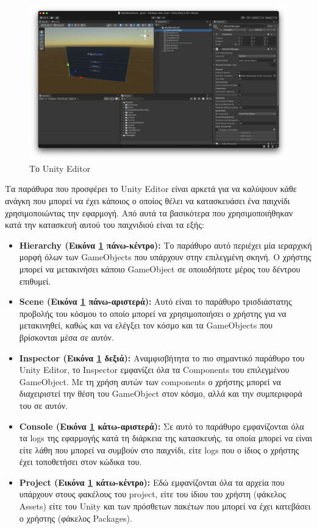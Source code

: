 \begin{figure}[H]
    \centering
    \includegraphics[width=1\linewidth]{sections/4/1/images/unity_editor}
    \caption{Το Unity Editor}
    \label{fig:unity_editor}
\end{figure}

Τα παράθυρα που προσφέρει το Unity Editor είναι αρκετά για να καλύψουν κάθε ανάγκη που μπορεί να έχει κάποιος ο οποίος θέλει να κατασκευάσει ένα παιχνίδι χρησιμοποιώντας την εφαρμογή. Από αυτά τα βασικότερα που χρησιμοποιήθηκαν κατά την κατασκευή αυτού του παιχνιδιού είναι τα εξής:

\begin{itemize}
    \item \textbf{Hierarchy (Εικόνα \ref{fig:unity_editor} πάνω-κέντρο):} Το παράθυρο αυτό περιέχει μία ιεραρχική μορφή όλων των GameObjects που υπάρχουν στην επιλεγμένη σκηνή. Ο χρήστης μπορεί να μετακινήσει κάποιο GameObject σε οποιοδήποτε μέρος του δέντρου επιθυμεί.
    \item \textbf{Scene (Εικόνα \ref{fig:unity_editor} πάνω-αριστερά):} Αυτό είναι το παράθυρο τρισδιάστατης προβολής του κόσμου το οποίο μπορεί να χρησιμοποιήσει ο χρήστης για να μετακινηθεί, καθώς και να ελέγξει τον κόσμο και τα GameObjects που βρίσκονται μέσα σε αυτόν.
    \item \textbf{Inspector (Εικόνα \ref{fig:unity_editor} δεξιά):} Αναμφισβήτητα το πιο σημαντικό παράθυρο του Unity Editor, το Inspector εμφανίζει όλα τα Components του επιλεγμένου GameObject. Με τη χρήση αυτών των components ο χρήστης μπορεί να διαχειριστεί την θέση του GameObject στον κόσμο, αλλά και την συμπεριφορά του σε αυτόν.
    \item \textbf{Console (Εικόνα \ref{fig:unity_editor} κάτω-αριστερά):} Σε αυτό το παράθυρο εμφανίζονται όλα τα logs της εφαρμογής κατά τη διάρκεια της κατασκευής, τα οποία μπορεί να είναι είτε λάθη που μπορεί να συμβούν στο παιχνίδι, είτε logs που ο ίδιος ο χρήστης έχει τοποθετήσει στον κώδικα του.
    \item \textbf{Project (Εικόνα \ref{fig:unity_editor} κάτω-κέντρο):} Εδώ εμφανίζονται όλα τα αρχεία που υπάρχουν στους φακέλους του project, είτε του ίδιου του χρήστη (φάκελος Assets) είτε του Unity και των πρόσθετων πακέτων που μπορεί να έχει κατεβάσει ο χρήστης (φάκελος Packages).
\end{itemize}

